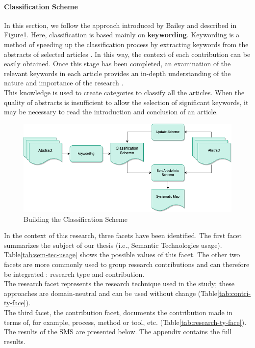             
            \paragraph{Classification Scheme}
            In this section, we follow the approach introduced by Bailey \cite{hill2019systematic} and described in Figure\ref{fig:BuildClassSchem}. Here, classification is based mainly on \textbf{keywording}. Keywording is a method of speeding up the classification process by extracting keywords from the abstracts of selected articles \cite{petersen2008systematic}. In this way, the context of each contribution can be easily obtained. Once this stage has been completed, an examination of the relevant keywords in each article provides an in-depth understanding of the nature and importance of the research \cite{petersen2008systematic}. \\
            This knowledge is used to create categories to classify all the articles. When the quality of abstracts is insufficient to allow the selection of significant keywords, it may be necessary to read the introduction and conclusion of an article.

            \begin{figure}[h]
                \centering
                \includegraphics[scale=0.6]{images/RelatedWork-Build-Class-Schem.drawio.png}  \caption{\label{fig:BuildClassSchem}  Building the Classification Scheme \cite{petersen2008systematic}}
            \end{figure}

           In the context of this research, three facets have been identified. The first facet summarizes the subject of our thesis (i.e., Semantic Technologies usage). Table\ref{tab:sem-tec-usage} shows the possible values of this facet. The other two facets are more commonly used to group research contributions and can therefore be integrated \cite{petersen2008systematic, wieringa2006requirements}: research type and contribution.\\
            The research facet represents the research technique used in the study; these approaches are domain-neutral and can be used without change (Table\ref{tab:contri-ty-face}).\\
            The third facet, the contribution facet, documents the contribution made in terms of, for example, process, method or tool, etc. (Table\ref{tab:research-ty-face}).\\
            The results of the SMS are presented below. The appendix contains the full results.

